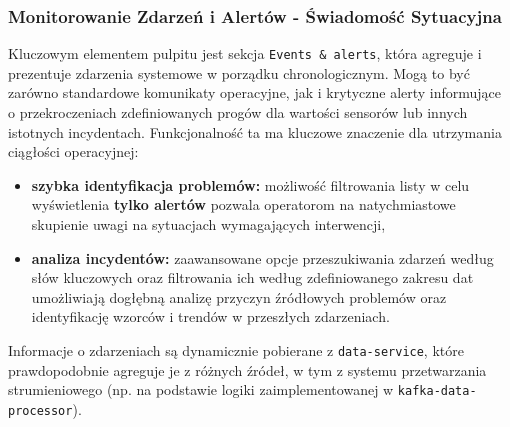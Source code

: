 \subsubsection{Monitorowanie Zdarzeń i Alertów - Świadomość Sytuacyjna}
Kluczowym elementem pulpitu jest sekcja \texttt{Events & alerts}, która agreguje i prezentuje zdarzenia systemowe w porządku chronologicznym. Mogą to być zarówno standardowe komunikaty operacyjne, jak i krytyczne alerty informujące o przekroczeniach zdefiniowanych progów dla wartości sensorów lub innych istotnych incydentach. Funkcjonalność ta ma kluczowe znaczenie dla utrzymania ciągłości operacyjnej:
\begin{itemize}
    \item \textbf{szybka identyfikacja problemów:} możliwość filtrowania listy w celu wyświetlenia \textbf{tylko alertów} pozwala operatorom na natychmiastowe skupienie uwagi na sytuacjach wymagających interwencji,
    \item \textbf{analiza incydentów:} zaawansowane opcje przeszukiwania zdarzeń według słów kluczowych oraz filtrowania ich według zdefiniowanego zakresu dat umożliwiają dogłębną analizę przyczyn źródłowych problemów oraz identyfikację wzorców i trendów w przeszłych zdarzeniach.
\end{itemize}
Informacje o zdarzeniach są dynamicznie pobierane z \texttt{data-service}, które prawdopodobnie agreguje je z różnych źródeł, w tym z systemu przetwarzania strumieniowego (np. na podstawie logiki zaimplementowanej w \texttt{kafka-data-processor}).

